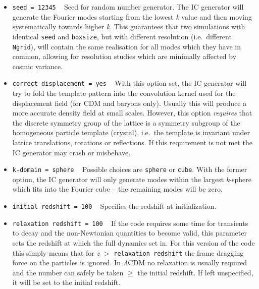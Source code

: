 \documentclass[a4paper,10pt]{article}
\begin{document}
\begin{itemize}
 \item[] \hspace{-25pt}\texttt{seed = 12345} ~ Seed for random number generator. The IC generator will generate the Fourier modes starting
 from the lowest \textit{k} value and then moving systematically towards higher \textit{k}. This guarantees that two simulations with
 identical \texttt{seed} and \texttt{boxsize}, but with different resolution (i.e.\ different \texttt{Ngrid}), will contain the same
 realisation for all modes which they have in common, allowing for resolution studies which are minimally affected by cosmic variance.
 \item[] \hspace{-25pt}\texttt{correct displacement = yes} ~ With this option set, the IC generator will try to fold the template pattern
 into the convolution kernel used for the displacement field (for CDM and baryons only). Usually this will produce a more accurate density
 field at small scales. However, this option \textit{requires} that the discrete symmetry group of the lattice is a symmetry subgroup of
 the homogeneous particle template (crystal), i.e.\ the template is invariant under lattice translations, rotations or reflections. If this
 requirement is not met the IC generator may crash or misbehave.
 \item[] \hspace{-25pt}\texttt{k-domain = sphere} ~ Possible choices are \texttt{sphere} or \texttt{cube}. With the former option, the IC
 generator will only generate modes within the largest \textit{k}-sphere which fits into the Fourier cube -- the remaining modes will be
 zero.
 \item[] \hspace{-25pt}\texttt{initial redshift = 100} ~ Specifies the redshift at initialization.
 \item[] \hspace{-25pt}\texttt{relaxation redshift = 100} ~ If the code requires some time for transients to decay and the non-Newtonian
 quantities to become valid, this parameter sets the redshift at which the full dynamics set in. For this version of the code this simply
 means that for \textit{z} $>$ \texttt{relaxation redshift} the frame dragging force on the particles is ignored. In $\mathsf{\Lambda}$CDM
 no relaxation is usually required and the number can safely be taken $\geq$ the initial redshift. If left unspecified, it will be set to
 the initial redshift.


\end{itemize}
\end{document}
